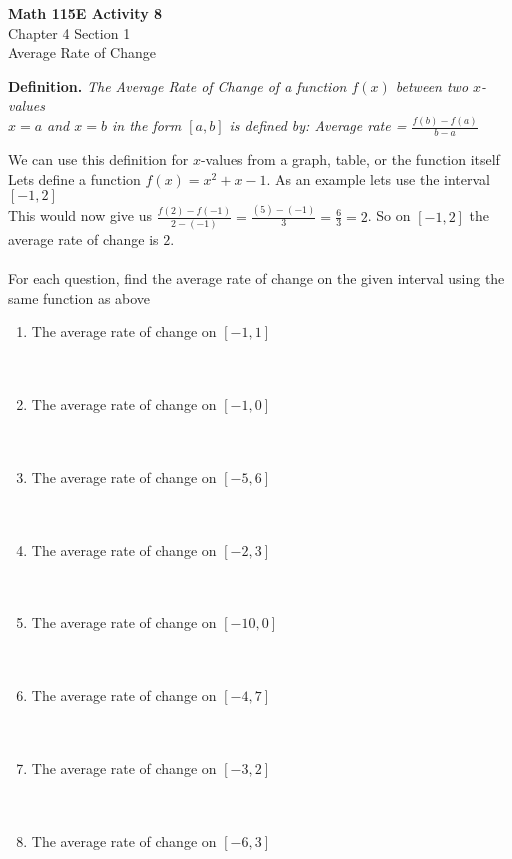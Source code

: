 \documentclass{article}
\begin{document}
\begin{center}
    \Large \textbf{Math 115E Activity 8} \\
    \vspace{0.2cm}
    \normalsize Chapter 4 Section 1 \\
    \normalsize Average Rate of Change
\end{center}

\begin{mdframed}
\textbf{Definition.} 
\textit
    {
    The Average Rate of Change of a function $f(x)$ between two $x$-values \\ 
    $x=a$ and $x=b$ in the form $[a,b]$ is defined by: Average rate = $\frac{f(b)-f(a)}{b-a}$
    }
\end{mdframed}
We can use this definition for $x$-values from a graph, table, or the function itself\\
Lets define a function $f(x)=x^2+x-1$. As an example lets use the interval $[-1,2]$\\
This would now give us $\frac{f(2)-f(-1)}{2-(-1)}=\frac{(5)-(-1)}{3}=\frac{6}{3}=2$.
So on $[-1,2]$ the average rate of change is $2$.\\\\
\noindent
For each question, find the average rate of change on the given interval using the same function as above\\
\begin{enumerate}
    \item The average rate of change on $[-1,1]$
    \\\\\\
    \item The average rate of change on $[-1,0]$
    \\\\\\
    \item The average rate of change on $[-5,6]$
    \\\\\\
    \item The average rate of change on $[-2,3]$
    \\\\\\
    \item The average rate of change on $[-10,0]$
    \\\\\\
    \item The average rate of change on $[-4,7]$
    \\\\\\
    \item The average rate of change on $[-3,2]$
    \\\\\\
    \item The average rate of change on $[-6,3]$
\end{enumerate}
\end{document}
